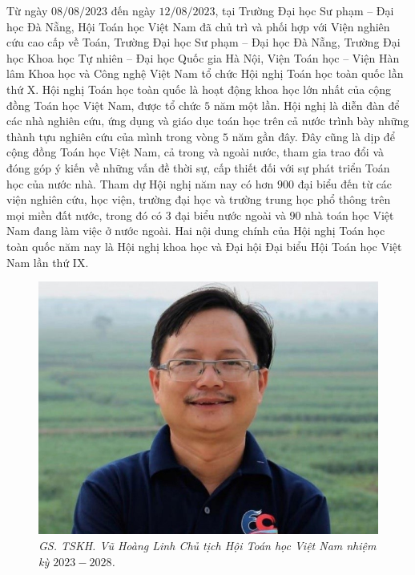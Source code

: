 \begin{multicols}{2}	
	Từ ngày $08/08/2023$ đến ngày $12/08/2023$, tại Trường Đại học Sư phạm -- Đại học Đà Nẵng, Hội Toán học Việt Nam đã chủ trì và phối hợp với Viện nghiên cứu cao cấp về Toán, Trường Đại học Sư phạm -- Đại học Đà Nẵng, Trường Đại học Khoa học Tự nhiên -- Đại học Quốc gia Hà Nội, Viện Toán học -- Viện Hàn lâm Khoa học và Công nghệ Việt Nam tổ chức Hội nghị Toán học toàn quốc lần thứ X.
	\vskip 0.1cm
	Hội nghị Toán học toàn quốc là hoạt động khoa học lớn nhất của cộng đồng Toán học Việt Nam, được tổ chức $5$ năm một lần. Hội nghị là diễn đàn để các nhà nghiên cứu, ứng dụng và giáo dục toán học trên cả nước trình bày những thành tựu nghiên cứu của mình trong vòng $5$ năm gần đây. Đây cũng là dịp để cộng đồng Toán học Việt Nam, cả trong và ngoài nước, tham gia trao đổi và đóng góp ý kiến về những vấn đề thời sự, cấp thiết đối với sự phát triển Toán học của nước nhà. Tham dự Hội nghị năm nay có hơn $900$ đại biểu đến từ các viện nghiên cứu, học viện, trường đại học và trường trung học phổ thông trên mọi miền đất nước, trong đó có $3$ đại biểu nước ngoài và $90$ nhà toán học Việt Nam đang làm việc ở nước ngoài. Hai nội dung chính của Hội nghị Toán học toàn quốc năm nay là Hội nghị khoa học và Đại hội Đại biểu Hội Toán học Việt Nam lần thứ IX.
	\begin{figure}[H]
		\vspace*{-5pt}
		\centering
		\captionsetup{labelformat= empty, justification=centering}
		\includegraphics[width= 1\linewidth]{2}
		\caption{\small\textit{\color{doisongtoanhoc}GS. TSKH. Vũ Hoàng Linh Chủ tịch Hội Toán học Việt Nam nhiệm kỳ $2023-2028$.}}
		\vspace*{-10pt}

\end{figure}
\end{multicols}
